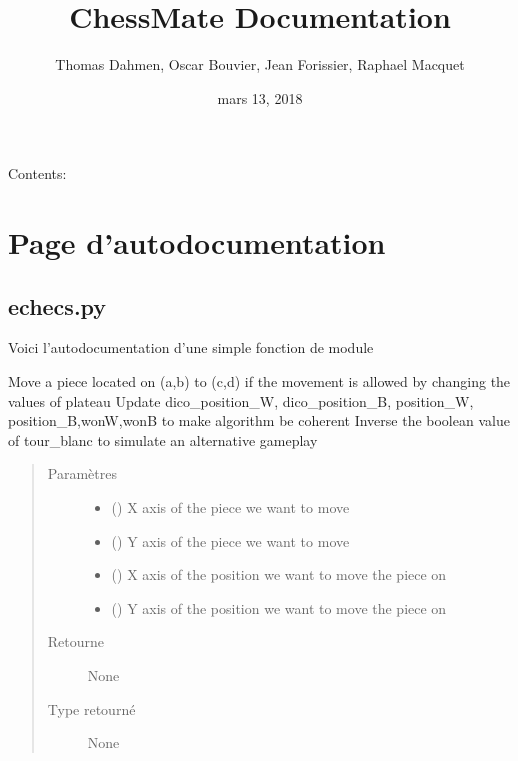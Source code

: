 \documentclass[letterpaper,10pt,french]{sphinxmanual}
\title{ChessMate Documentation}
\date{mars 13, 2018}
\author{Thomas Dahmen, Oscar Bouvier, Jean Forissier, Raphael Macquet}
\begin{document}
\maketitle
\sphinxtableofcontents
{}\label{\detokenize{index::doc}}


Contents:


\chapter{Page d’autodocumentation}
\label{\detokenize{autodoc:bienvenue-sur-cette-documentation}}\label{\detokenize{autodoc:page-d-autodocumentation}}\label{\detokenize{autodoc::doc}}

\section{echecs.py}
\label{\detokenize{autodoc:echecs-py}}
Voici l’autodocumentation d’une simple fonction de module

\begin{fulllineitems}
\label{\detokenize{autodoc:echecs.move}}
Move a piece located on (a,b) to (c,d) if the movement is allowed by changing the values of plateau
Update dico\_position\_W, dico\_position\_B, position\_W, position\_B,wonW,wonB to make algorithm be coherent
Inverse the boolean value of tour\_blanc to simulate an alternative gameplay
\begin{quote}\begin{description}
\item[{Paramètres}] \leavevmode\begin{itemize}
\item {} 
 () \textendash{} X axis of the piece we want to move

\item {} 
 () \textendash{} Y axis of the piece we want to move

\item {} 
 () \textendash{} X axis of the position we want to move the piece on

\item {} 
 () \textendash{} Y axis of the position we want to move the piece on

\end{itemize}

\item[{Retourne}] \leavevmode
None

\item[{Type retourné}] \leavevmode
None

\end{description}\end{quote}

\end{fulllineitems}
\end{document}
